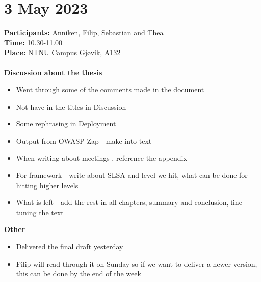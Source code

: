 \section{3 May 2023}
\label{ChangeFinalDraftDateMeeting}
\textbf{Participants:} Anniken, Filip, Sebastian and Thea \\
\textbf{Time:} 10.30-11.00 \\
\textbf{Place:} NTNU Campus Gjøvik, A132
\\~\\
\textbf{\underline{Discussion about the thesis}}
\begin{itemize}
    \item Went through some of the comments made in the document
    \item Not have  in the titles in Discussion
    \item Some rephrasing in Deployment
    \item Output from OWASP Zap - make into text
    \item When writing about meetings , reference the appendix
    \item For framework - write about SLSA and level we hit, what can be done for hitting higher levels
    \item What is left - add the rest in all chapters, summary and conclusion, fine-tuning the text
\end{itemize}

\textbf{\underline{Other}}
\begin{itemize}
    \item Delivered the final draft yesterday
    \item Filip will read through it on Sunday so if we want to deliver a newer version, this can be done by the end of the week
\end{itemize}